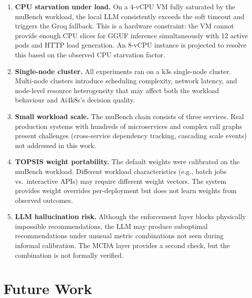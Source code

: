 \begin{enumerate}
  \item \textbf{CPU starvation under load.} On a 4-vCPU VM fully saturated by
  the muBench workload, the local LLM consistently exceeds the soft timeout
  and triggers the Groq fallback. This is a hardware constraint: the VM cannot
  provide enough CPU slices for GGUF inference simultaneously with 12 active
  pods and HTTP load generation. An 8-vCPU instance is projected to resolve
  this based on the observed CPU starvation factor.

  \item \textbf{Single-node cluster.} All experiments ran on a k3s single-node
  cluster. Multi-node clusters introduce scheduling complexity, network latency,
  and node-level resource heterogeneity that may affect both the workload
  behaviour and Ai4k8s's decision quality.

  \item \textbf{Small workload scale.} The muBench chain consists of three
  services. Real production systems with hundreds of microservices and complex
  call graphs present challenges (cross-service dependency tracking, cascading
  scale events) not addressed in this work.

  \item \textbf{TOPSIS weight portability.} The default weights were calibrated
  on the muBench workload. Different workload characteristics (e.g., batch
  jobs vs.\ interactive APIs) may require different weight vectors. The system
  provides weight overrides per-deployment but does not learn weights from
  observed outcomes.

  \item \textbf{LLM hallucination risk.} Although the enforcement layer blocks
  physically impossible recommendations, the LLM may produce suboptimal
  recommendations under unusual metric combinations not seen during informal
  calibration. The MCDA layer provides a second check, but the combination
  is not formally verified.
\end{enumerate}

\section{Future Work}
\label{sec:future}

